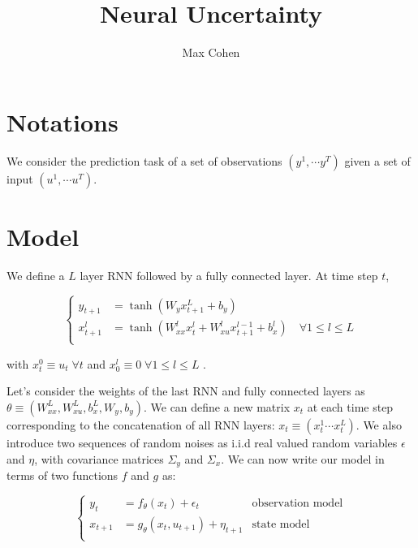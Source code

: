 \documentclass[10pt,a4paper]{article}
\begin{document}
\title{Neural Uncertainty}
\author{Max Cohen}

\section{Notations}
We consider the prediction task of a set of observations $(y^1, \cdots y^T)$ given a set of input $(u^1, \cdots u^T)$.

\section{Model}
We define a $L$ layer RNN followed by a fully connected layer. At time step $t$,

\begin{equation*}
        \left\{
        \begin{aligned}
                y_{t+1}   & = \tanh(W_y x_{t+1}^L + b_y)                                                               \\
                x_{t+1}^l & = \tanh(W_{xx}^l x^{l}_{t} + W_{xu}^l x^{l-1}_{t+1} + b_x^l) \quad \forall 1 \leq l \leq L \\
        \end{aligned}
        \right.
\end{equation*}

with $x_{t}^0 \equiv u_{t} \; \forall t$ and $x_{0}^l \equiv 0 \; \forall 1 \leq l \leq L$ .

Let's consider the weights of the last RNN and fully connected layers as $\theta \equiv (W_{xx}^L, W_{xu}^L, b_x^L, W_y, b_y)$.
We can define a new matrix $x_t$ at each time step corresponding to the concatenation of all RNN layers: $x_t \equiv (x_t^1 \cdots x_t^L)$.
We also introduce two sequences of random noises as i.i.d real valued random variables $\epsilon$ and $\eta$, with covariance matrices $\Sigma_y$ and $\Sigma_x$.
We can now write our model in terms of two functions $f$ and $g$ as:

\begin{equation}
        \left\{
        \begin{aligned}
                y_t     & = f_\theta(x_t) + \epsilon_t            & \text{observation model} \\
                x_{t+1} & = g_\theta(x_{t}, u_{t+1}) + \eta_{t+1} & \text{state model}       \\
        \end{aligned}
        \right.
\end{equation}
\end{document}
